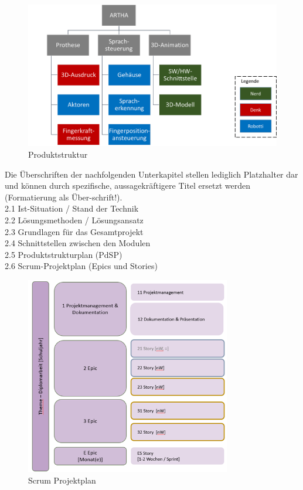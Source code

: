 \documentclass[12pt]{article}
\begin{document}
\begin{figure}[h]
    \includegraphics[width=1\textwidth]{Produktstruktur.png}
    \centering
    \caption{Produktstruktur}
    \label{Produktstruktur}
\end{figure}

Die Überschriften der nachfolgenden Unterkapitel stellen lediglich Platzhalter dar und können durch spezifische, aussagekräftigere Titel ersetzt werden (Formatierung als Über-schrift!).\\
2.1 Ist-Situation / Stand der Technik\\
2.2 Lösungsmethoden / Lösungsansatz\\
2.3 Grundlagen für das Gesamtprojekt\\
2.4 Schnittstellen zwischen den Modulen\\
2.5 Produktstrukturplan (PdSP)\\
2.6 Scrum-Projektplan (Epics und Stories)

\begin{figure}[h]
    \includegraphics[width=0.8\textwidth]{Scrum_Projektplan.png}
    \centering
    \caption{Scrum Projektplan}
\end{figure}
\end{document}
